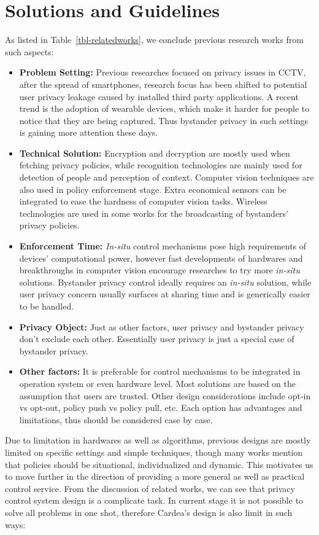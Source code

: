 \section{Solutions and Guidelines}
As listed in Table~\ref{tbl-relatedworks}, we conclude previous research works from such aspects:

\begin{itemize}
  \item {\bf Problem Setting:} Previous researches focused on privacy issues in CCTV, after the spread of smartphones, research focus has been shifted to potential user privacy leakage caused by installed third party applications. A recent trend is the adoption of wearable devices, which make it harder for people to notice that they are being captured. Thus bystander privacy in such settings is gaining more attention these days.
  \item {\bf Technical Solution:} Encryption and decryption are mostly used when fetching privacy policies, while recognition technologies are mainly used for detection of people and perception of context. Computer vision techniques are also used in policy enforcement stage. Extra economical sensors can be integrated to ease the hardness of computer vision tasks. Wireless technologies are used in some works for the broadcasting of bystanders' privacy policies.
  \item {\bf Enforcement Time:} \emph{In-situ} control mechanisms pose high requirements of devices' computational power, however fast developments of hardwares and breakthroughs in computer vision encourage researches to try more \emph{in-situ} solutions. Bystander privacy control ideally requires an \emph{in-situ} solution, while user privacy concern usually surfaces at sharing time and is generically easier to be handled.
  \item {\bf Privacy Object:} Just as other factors, user privacy and bystander privacy don't exclude each other. Essentially user privacy is just a special case of bystander privacy.
  \item {\bf Other factors:} It is preferable for control mechanisms to be integrated in operation system or even hardware level. Most solutions are based on the assumption that users are trusted. Other design considerations include opt-in vs opt-out, policy push vs policy pull, etc. Each option has advantages and limitations, thus should be considered case by case.
\end{itemize}

Due to limitation in hardwares as well as algorithms, previous designs are mostly limited on specific settings and simple techniques, though many works mention that policies should be situational, individualized and dynamic. This motivates us to move further in the direction of providing a more general as well as practical control service. From the discussion of related works, we can see that privacy control system design is a complicate task. In current stage it is not possible to solve all problems in one shot, therefore Cardea's design is also limit in such ways:

